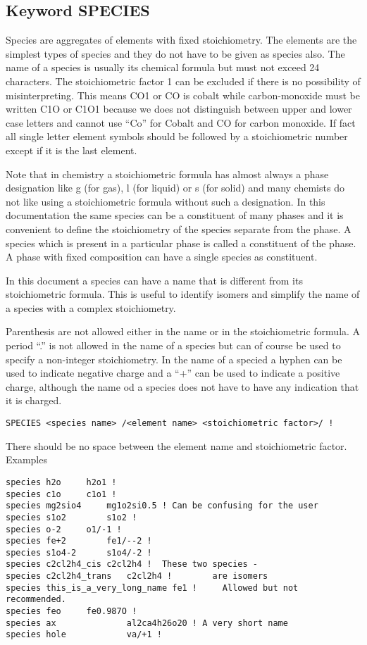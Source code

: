 \documentclass[12pt]{article}
\begin{document}
\subsection{Keyword SPECIES}

Species are aggregates of elements with fixed stoichiometry.  The
elements are the simplest types of species and they do not have to be
given as species also.  The name of a species is usually its chemical
formula but must not exceed 24 characters.  The stoichiometric factor
1 can be excluded if there is no possibility of misinterpreting.  This
means CO1 or CO is cobalt while carbon-monoxide must be written C1O or
C1O1 because we does not distinguish between upper and lower case
letters and cannot use ``Co'' for Cobalt and CO for carbon monoxide.
If fact all single letter element symbols should be followed by a
stoichiometric number except if it is the last element.

Note that in chemistry a stoichiometric formula has almost always a
phase designation like g (for gas), l (for liquid) or s (for solid)
and many chemists do not like using a stoichiometric formula without
such a designation.  In this documentation the same species can be a
constituent of many phases and it is convenient to define the
stoichiometry of the species separate from the phase.  A species which
is present in a particular phase is called a constituent of the phase.
A phase with fixed composition can have a single species as
constituent.

In this document a species can have a name that is different from its
stoichiometric formula.  This is useful to identify isomers and
simplify the name of a species with a complex stoichiometry.

Parenthesis are not allowed either in the name or in the
stoichiometric formula.  A period ``.'' is not allowed in the name of
a species but can of course be used to specify a non-integer
stoichiometry.  In the name of a specied a hyphen can be used to
indicate negative charge and a ``+'' can be used to indicate a
positive charge, although the name od a species does not have to have
any indication that it is charged.

\begin{verbatim}
SPECIES <species name> /<element name> <stoichiometric factor>/ !
\end{verbatim}

There should be no space between the element name and stoichiometric
factor.  Examples

\begin{verbatim}
species h2o		h2o1 !
species c1o		c1o1 !
species mg2sio4		mg1o2si0.5 ! Can be confusing for the user
species s1o2		s1o2 !
species o-2		o1/-1 !
species fe+2		fe1/--2 !
species s1o4-2		s1o4/-2 !
species c2cl2h4_cis	c2cl2h4 !  These two species -
species c2cl2h4_trans	c2cl2h4 !        are isomers
species this_is_a_very_long_name fe1 !     Allowed but not recommended.
species feo		fe0.987O !
species ax              al2ca4h26o20 ! A very short name
species hole            va/+1 !
\end{verbatim}
\end{document}
